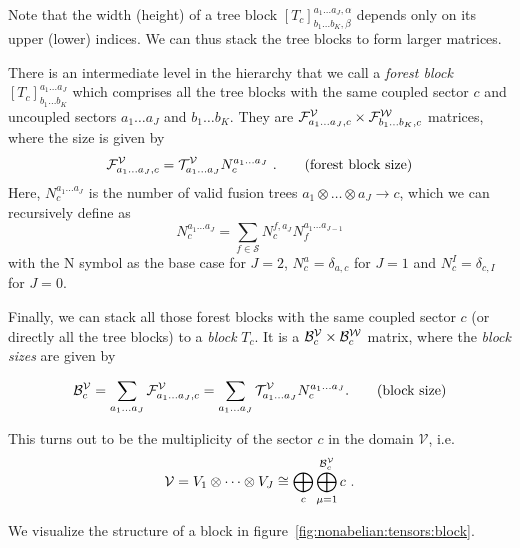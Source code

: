 Note that the width (height) of a tree block $[T_c]^{a_1\dots a_J, \alpha}_{b_1\dots b_K,\beta}$ depends only on its upper (lower) indices.
We can thus stack the tree blocks to form larger matrices.

There is an intermediate level in the hierarchy that we call a \emph{forest block} $[T_c]^{a_1\dots a_J}_{b_1\dots b_K}$ which comprises all the tree blocks with the same coupled sector $c$ and uncoupled sectors $a_1\dots a_J$ and $b_1\dots b_K$.
They are $\mathcal{F}^{\mathcal{V}}_{a_1\dots a_J,c} \times \mathcal{F}^{\mathcal{W}}_{b_1\dots b_K,c}$ matrices, where the size is given by
\begin{equation}
    \mathcal{F}^{\mathcal{V}}_{a_1\dots a_J,c}
    = \mathcal{T}^{\mathcal{V}}_{a_1\dots a_J} N^{a_1\dots a_J}_{c}
    ~.
    \qquad\text{(forest block size)}
\end{equation}
Here, $N^{a_1\dots a_J}_c$ is the number of valid fusion trees $a_1 \otimes \dots \otimes a_J \to c$, which we can recursively define as 
\begin{equation}
    N^{a_1\dots a_J}_c = \sum_{f\in\mathcal{S}} N^{f,a_J}_c N^{a_1\dots a_{J-1}}_f
\end{equation}
with the N symbol as the base case for $J=2$, $N^{a}_c = \delta_{a,c}$ for $J=1$ and $N^{I}_c = \delta_{c,I}$ for $J=0$.

Finally, we can stack all those forest blocks with the same coupled sector $c$ (or directly all the tree blocks) to a \emph{block} $T_c$.
It is a $\mathcal{B}^{\mathcal{V}}_{c} \times \mathcal{B}^{\mathcal{W}}_{c}$ matrix, where the \emph{block sizes} are given by

\begin{equation}
    \mathcal{B}^{\mathcal{V}}_{c}
    = \sum_{a_1\dots a_J} \mathcal{F}^{\mathcal{V}}_{a_1\dots a_J,c}
    = \sum_{a_1\dots a_J} \mathcal{T}^{\mathcal{V}}_{a_1\dots a_J} N^{a_1\dots a_J}_{c}
    .
    \qquad\text{(block size)}
\end{equation}

This turns out to be the multiplicity of the sector $c$ in the domain $\mathcal{V}$, i.e.
\begin{equation}
    \mathcal{V} = V_1 \otimes \dots \otimes V_J
    \cong \bigoplus_c \bigoplus_{\mu=1}^{\mathcal{B}^{\mathcal{V}}_{c}} c
    ~.
\end{equation}

We visualize the structure of a block in figure~\ref{fig:nonabelian:tensors:block}.

